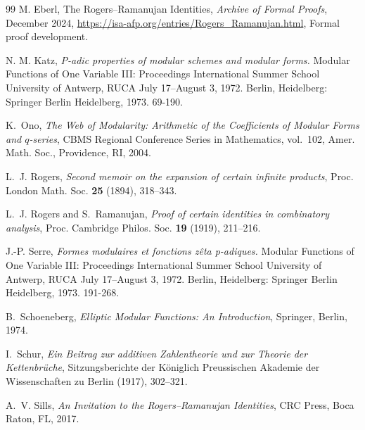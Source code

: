 \documentclass[12pt]{amsart}
\theoremstyle{definition}
\theoremstyle{remark}
\numberwithin{equation}{subsection}
\begin{document}
\begin{thebibliography}{99}
M. Eberl, The Rogers–Ramanujan Identities, \emph{Archive of Formal Proofs}, December 2024, \url{https://isa-afp.org/entries/Rogers_Ramanujan.html}, Formal proof development.

N. M. Katz, \emph{P-adic properties of modular schemes and modular forms.} Modular Functions of One Variable III: Proceedings International Summer School University of Antwerp, RUCA July 17–August 3, 1972. Berlin, Heidelberg: Springer Berlin Heidelberg, 1973. 69-190.




K.~Ono, \emph{The Web of Modularity: Arithmetic of the Coefficients of Modular Forms and $q$-series}, CBMS Regional Conference Series in Mathematics, vol.~102, Amer. Math. Soc., Providence, RI, 2004.

L.~J. Rogers, \emph{Second memoir on the expansion of certain infinite products}, Proc. London Math. Soc. \textbf{25} (1894), 318--343.

L.~J. Rogers and S.~Ramanujan, \emph{Proof of certain identities in combinatory analysis}, Proc. Cambridge Philos. Soc. \textbf{19} (1919), 211--216.

J.-P. Serre, \emph{Formes modulaires et fonctions z\^{e}ta p-adiques.} Modular Functions of One Variable III: Proceedings International Summer School University of Antwerp, RUCA July 17–August 3, 1972. Berlin, Heidelberg: Springer Berlin Heidelberg, 1973. 191-268.

B.~Schoeneberg, \emph{Elliptic Modular Functions: An Introduction}, Springer, Berlin, 1974.

I.~Schur, \emph{Ein Beitrag zur additiven Zahlentheorie und zur Theorie der Kettenbr\"uche}, Sitzungsberichte der K\"oniglich Preussischen Akademie der Wissenschaften zu Berlin (1917), 302--321.

A.~V. Sills, \emph{An Invitation to the Rogers--Ramanujan Identities}, CRC Press, Boca Raton, FL, 2017.


\end{thebibliography}
\end{document}
